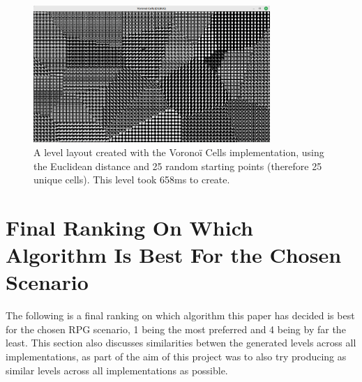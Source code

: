 \begin{figure}[H]
    \centering
    \includegraphics[width=0.8\textwidth]{Images/voronoi-25-658ms.png}
    \caption{A level layout created with the Voronoï Cells implementation, using the Euclidean distance and 25 random starting points (therefore 25 unique cells). This level took 658ms to create.}
    \label{fig:voronoilevel2}
\end{figure}

\section{Final Ranking On Which Algorithm Is Best For the Chosen Scenario}

The following is a final ranking on which algorithm this paper has decided is best for the chosen RPG scenario, 1 being the most preferred and 4 being by far the least. This section also discusses similarities betwen the generated levels across all implementations, as part of the aim of this project was to also try producing as similar levels across all implementations as possible.

